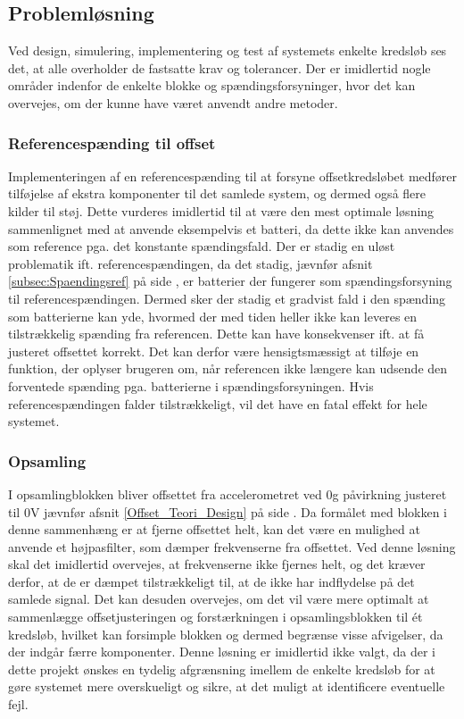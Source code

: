 \subsection{Problemløsning}
Ved design, simulering, implementering og test af systemets enkelte kredsløb ses det, at alle overholder de fastsatte krav og tolerancer. Der er imidlertid nogle områder indenfor de enkelte blokke og spændingsforsyninger, hvor det kan overvejes, om der kunne have været anvendt andre metoder.

\subsubsection{Referencespænding til offset}
Implementeringen af en referencespænding til at forsyne offsetkredsløbet medfører tilføjelse af ekstra komponenter til det samlede system, og dermed også flere kilder til støj. Dette vurderes imidlertid til at være den mest optimale løsning sammenlignet med at anvende eksempelvis et batteri, da dette ikke kan anvendes som reference pga. det konstante spændingsfald. Der er stadig en uløst problematik ift. referencespændingen, da det stadig, jævnfør afsnit \ref{subsec:Spaendingsref} på side \pageref{subsec:Spaendingsref}, er batterier der fungerer som spændingsforsyning til referencespændingen. Dermed sker der stadig et gradvist fald i den spænding som batterierne kan yde, hvormed der med tiden heller ikke kan leveres en tilstrækkelig spænding fra referencen. Dette kan have konsekvenser ift. at få justeret offsettet korrekt. Det kan derfor være hensigtsmæssigt at tilføje en funktion, der oplyser brugeren om, når referencen ikke længere kan udsende den forventede spænding pga. batterierne i spændingsforsyningen. Hvis referencespændingen falder tilstrækkeligt, vil det have en fatal effekt for hele systemet.

\subsubsection{Opsamling}
I opsamlingblokken bliver offsettet fra accelerometret ved $0$g påvirkning justeret til $0$V jævnfør afsnit \ref{Offset_Teori_Design} på side \pageref{Offset_Teori_Design}. Da formålet med blokken i denne sammenhæng er at fjerne offsettet helt, kan det være en mulighed at anvende et højpasfilter, som dæmper frekvenserne fra offsettet. Ved denne løsning skal det imidlertid overvejes, at frekvenserne ikke fjernes helt, og det kræver derfor, at de er dæmpet tilstrækkeligt til, at de ikke har indflydelse på det samlede signal. Det kan desuden overvejes, om det vil være mere optimalt at sammenlægge offsetjusteringen og forstærkningen i opsamlingsblokken til ét kredsløb, hvilket kan forsimple blokken og dermed begrænse visse afvigelser, da der indgår færre komponenter. Denne løsning er imidlertid ikke valgt, da der i dette projekt ønskes en tydelig afgrænsning imellem de enkelte kredsløb for at gøre systemet mere overskueligt og sikre, at det muligt at identificere eventuelle fejl. 

